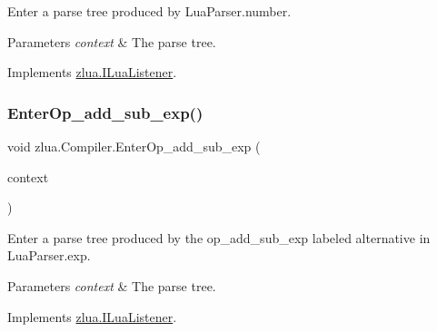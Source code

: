 Enter a parse tree produced by Lua\+Parser.\+number. 


\begin{DoxyParams}{Parameters}
{\em context} & The parse tree.\\
\hline
\end{DoxyParams}


Implements \mbox{\hyperlink{interfacezlua_1_1_i_lua_listener_a2668a5683590d30b5a267950efa4e247}{zlua.\+I\+Lua\+Listener}}.

\mbox{\label{classzlua_1_1_compiler_abd725a31350fd6d1a132042ccda04b14}} 
\subsubsection{\texorpdfstring{Enter\+Op\+\_\+add\+\_\+sub\+\_\+exp()}{EnterOp\_add\_sub\_exp()}}
{\footnotesize\ttfamily void zlua.\+Compiler.\+Enter\+Op\+\_\+add\+\_\+sub\+\_\+exp (\begin{DoxyParamCaption}\item[{\mbox{[}\+Not\+Null\mbox{]} \mbox{\hyperlink{classzlua_1_1_lua_parser_1_1_op__add__sub__exp_context}{Lua\+Parser.\+Op\+\_\+add\+\_\+sub\+\_\+exp\+Context}}}]{context }\end{DoxyParamCaption})}



Enter a parse tree produced by the {\ttfamily op\+\_\+add\+\_\+sub\+\_\+exp} labeled alternative in Lua\+Parser.\+exp. 


\begin{DoxyParams}{Parameters}
{\em context} & The parse tree.\\
\hline
\end{DoxyParams}


Implements \mbox{\hyperlink{interfacezlua_1_1_i_lua_listener_a1633c1d8de4e31ea48b020df3c5dba75}{zlua.\+I\+Lua\+Listener}}.

\mbox{\label{classzlua_1_1_compiler_a057cdeaef67ecf5a4d53ea10833b3d24}} 
